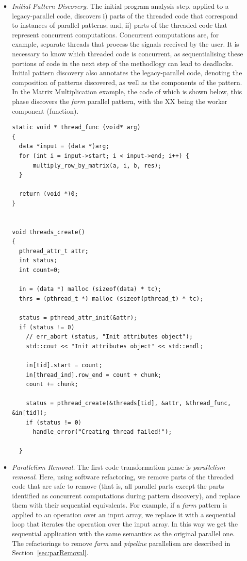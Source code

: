 \begin{itemize}
\item \emph{Initial Pattern Discovery.} The initial program analysis step, applied to a legacy-parallel code, discovers i) parts of the threaded code that correspond to instances of parallel patterns; and, ii) parts of the threaded code that represent concurrent computations. Concurrent computations are, for example, separate threads that process the signals received by the user. It is necessary to know which threaded code is concurrent, as sequentialising these portions of code in the next step of the methodlogy can lead to deadlocks. Initial pattern discovery also annotates the legacy-parallel code, denoting the composition of patterns discovered, as well as the components of the pattern. In the Matrix Multiplication example, the code of which is shown below, this phase discovers the \emph{farm} parallel pattern, with the XX being the worker component (function).

\begin{lstlisting}
static void * thread_func (void* arg)
{
  data *input = (data *)arg;
  for (int i = input->start; i < input->end; i++) {
	  multiply_row_by_matrix(a, i, b, res);
  }

  return (void *)0;
}


void threads_create()
{
  pthread_attr_t attr;
  int status;
  int count=0;
  
  in = (data *) malloc (sizeof(data) * tc);
  thrs = (pthread_t *) malloc (sizeof(pthread_t) * tc);
  
  status = pthread_attr_init(&attr);
  if (status != 0)
    // err_abort (status, "Init attributes object");
    std::cout << "Init attributes object" << std::endl;

    in[tid].start = count;
    in[thread_ind].row_end = count + chunk;
    count += chunk;

    status = pthread_create(&threads[tid], &attr, &thread_func, &in[tid]);
    if (status != 0)
      handle_error("Creating thread failed!");

  }

\end{lstlisting}
  

\item \emph{Parallelism Removal.} The first code transformation phase is \emph{parallelism removal}. Here, using software refactoring, we remove parts of the threaded code  that are safe to remove (that is, all parallel parts except the parts identified as concurrent computations during pattern discovery), and replace them with their sequential equivalents. For example, if a \emph{farm} pattern is applied to an operation over an input array, we replace it with a sequential loop that iterates the operation over the input array. In this way we get the sequential application with the same semantics as the original parallel one. The refactorings to remove \emph{farm} and \emph{pipeline} parallelism are described in Section~\ref{sec:parRemoval}.


\end{itemize}
